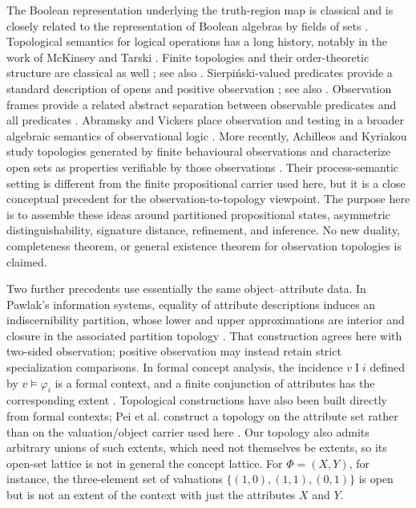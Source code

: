 \documentclass[11pt]{article}
\theoremstyle{definition}
\theoremstyle{plain}
\theoremstyle{remark}
\begin{document}
The Boolean representation underlying the truth-region map is classical and
is closely related to the representation of Boolean algebras by fields of sets
\cite{Stone1936}.  Topological semantics for logical operations has a long
history, notably in the work of McKinsey and Tarski \cite{McKinseyTarski1944}.
Finite topologies and their order-theoretic structure are classical as well
\cite[pp.~325--327]{Stong1966}; see also \cite{Alexandroff1937}.
Sierpi\'nski-valued predicates provide a standard description of opens and
positive observation \cite[Ch.~1]{Vickers1989}; see also
\cite[Example~1.12(3)]{Vickers2007}.
Observation frames provide a related abstract separation between observable
predicates and all predicates \cite{BonsangueJacobsKok1995}.  Abramsky and
Vickers place observation and testing in a broader algebraic semantics of
observational logic \cite{AbramskyVickers1993}.  More recently, Achilleos and
Kyriakou study topologies generated by finite behavioural observations and
characterize open sets as properties verifiable by those observations
\cite{AchilleosKyriakou2026}.  Their process-semantic setting is different from
the finite propositional carrier used here, but it is a close conceptual
precedent for the observation-to-topology viewpoint.  The purpose here is to
assemble these ideas around partitioned propositional states, asymmetric
distinguishability, signature distance, refinement, and inference.  No new
duality, completeness theorem, or general existence theorem for observation
topologies is claimed.

Two further precedents use essentially the same object--attribute data.  In
Pawlak's information systems, equality of attribute descriptions induces an
indiscernibility partition, whose lower and upper approximations are interior
and closure in the associated partition topology
\cite[Sec.~2.2, pp.~343--344]{Pawlak1982}.  That
construction agrees here with two-sided observation; positive observation may
instead retain strict specialization comparisons.  In formal concept analysis,
the incidence $v\mathrel I i$ defined by $v\models\varphi_i$ is a formal context,
and a finite conjunction of attributes has the corresponding extent
\cite[Sec.~1.1]{GanterWille1999}.  Topological constructions have also been built
directly from formal contexts; Pei et al. construct a topology on the attribute
set rather than on the valuation/object carrier used here \cite{PeiEtAl2013}.
Our topology also admits arbitrary unions of such extents, which need not
themselves be extents, so its open-set lattice is not in general the concept
lattice.  For $\Phi=(X,Y)$, for instance, the three-element
set of valuations $\{(1,0),(1,1),(0,1)\}$ is open but is not an extent of the
context with just the attributes $X$ and $Y$.
\end{document}
